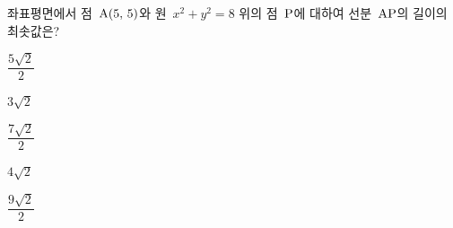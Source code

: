 좌표평면에서 점~$\mathrm{A}(5,\mkern3mu 5)$와 원~$x^2+y^2=8$ 위의 점~$\mathrm{P}$에 대하여 선분~$\mathrm{AP}$의 길이의 최솟값은?
\begin{choices32}{\rule[-3ex]{0pt}{8ex}$\dfrac{5\sqrt{2}}{2}$}{\rule[-3ex]{0pt}{8ex}$3\sqrt{2}$}{\rule[-3ex]{0pt}{8ex}$\dfrac{7\sqrt{2}}{2}$}{\rule[-3ex]{0pt}{8ex}$4\sqrt{2}$}{\rule[-3ex]{0pt}{8ex}$\dfrac{9\sqrt{2}}{2}$}\end{choices32}
